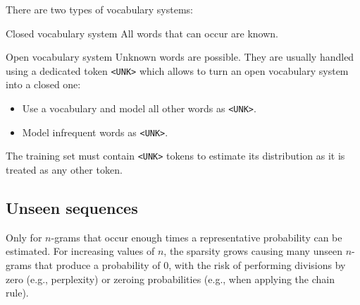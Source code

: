 There are two types of vocabulary systems:
\begin{descriptionlist}
    \item[Closed vocabulary system] 
        All words that can occur are known.

    \item[Open vocabulary system] 
        Unknown words are possible. They are usually handled using a dedicated token \texttt{<UNK>} which allows to turn an open vocabulary system into a closed one:
        \begin{itemize}
            \item Use a vocabulary and model all other words as \texttt{<UNK>}.
            \item Model infrequent words as \texttt{<UNK>}.
        \end{itemize}

        \begin{remark}
            The training set must contain \texttt{<UNK>} tokens to estimate its distribution as it is treated as any other token.
        \end{remark}
\end{descriptionlist}


\subsection{Unseen sequences}

Only for $n$-grams that occur enough times a representative probability can be estimated. For increasing values of $n$, the sparsity grows causing many unseen $n$-grams that produce a probability of $0$, with the risk of performing divisions by zero (e.g., perplexity) or zeroing probabilities (e.g., when applying the chain rule).

